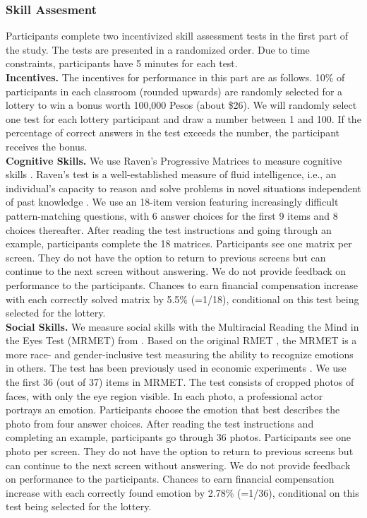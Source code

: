 \documentclass[11pt,a4paper,oneside]{article}
\begin{document}
\subsubsection{Skill Assesment}
Participants complete two incentivized skill assessment tests in the first part of the study. The tests are presented in a randomized order. Due to time constraints, participants have 5 minutes for each test. \medskip\\
\textbf{Incentives.} The incentives for performance in this part are as follows. 10\% of participants in each classroom (rounded upwards) are randomly selected for a lottery to win a bonus worth 100,000 Pesos (about \$26). We will randomly select one test for each lottery participant and draw a number between 1 and 100. If the percentage of correct answers in the test exceeds the number, the participant receives the bonus. \medskip\\
\textbf{Cognitive Skills.} We use Raven's Progressive Matrices to measure cognitive skills \citep{raven_performances_1936, raven_standard_1976}. Raven’s test is a well-established measure of fluid intelligence, i.e., an individual’s capacity to reason and solve problems in novel situations independent of past knowledge \citep{schilbach_psychological_2016}. We use an 18-item version featuring increasingly difficult pattern-matching questions, with 6 answer choices for the first 9 items and 8 choices thereafter. After reading the test instructions and going through an example, participants complete the 18 matrices. Participants see one matrix per screen. They do not have the option to return to previous screens but can continue to the next screen without answering. We do not provide feedback on performance to the participants. Chances to earn financial compensation increase with each correctly solved matrix by 5.5\% (=1/18), conditional on this test being selected for the lottery.   
\medskip\\
\textbf{Social Skills.} We measure social skills with the Multiracial Reading the Mind in the Eyes Test (MRMET) from \citet{kim_multiracial_2022}. Based on the original RMET \citep{baron-cohen_reading_2001}, the MRMET is a more race- and gender-inclusive test measuring the ability to recognize emotions in others. The test has been previously used in economic experiments \citep{van_leeuwen_predictably_2018, weidmann_team_2021}. We use the first 36 (out of 37) items in MRMET. The test consists of cropped photos of faces, with only the eye region visible. In each photo, a professional actor portrays an emotion. Participants choose the emotion that best describes the photo from four answer choices. After reading the test instructions and completing an example, participants go through 36 photos. Participants see one photo per screen. They do not have the option to return to previous screens but can continue to the next screen without answering. We do not provide feedback on performance to the participants. Chances to earn financial compensation increase with each correctly found emotion by 2.78\% (=1/36), conditional on this test being selected for the lottery.
\end{document}
